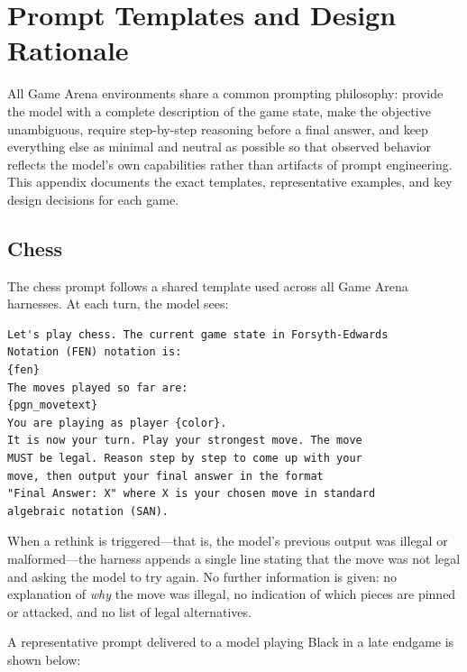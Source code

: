 \documentclass{article}
\begin{document}
\section{Prompt Templates and Design Rationale}
\label{app:prompts}

All Game Arena environments share a common prompting philosophy: provide the model with a complete description of the game state, make the objective unambiguous, require step-by-step reasoning before a final answer, and keep everything else as minimal and neutral as possible so that observed behavior reflects the model's own capabilities rather than artifacts of prompt engineering. This appendix documents the exact templates, representative examples, and key design decisions for each game.

\subsection{Chess}
\label{app:chess_prompt}

The chess prompt follows a shared template used across all Game Arena harnesses. At each turn, the model sees:

\begin{verbatim}
Let's play chess. The current game state in Forsyth-Edwards
Notation (FEN) notation is:
{fen}
The moves played so far are:
{pgn_movetext}
You are playing as player {color}.
It is now your turn. Play your strongest move. The move
MUST be legal. Reason step by step to come up with your
move, then output your final answer in the format
"Final Answer: X" where X is your chosen move in standard
algebraic notation (SAN).
\end{verbatim}

When a rethink is triggered---that is, the model's previous output was illegal or malformed---the harness appends a single line stating that the move was not legal and asking the model to try again. No further information is given: no explanation of \emph{why} the move was illegal, no indication of which pieces are pinned or attacked, and no list of legal alternatives.

A representative prompt delivered to a model playing Black in a late endgame is shown below:
\end{document}
